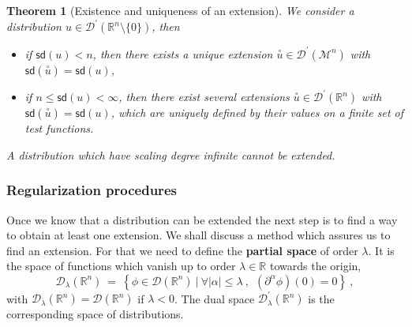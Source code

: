 \documentclass[11pt]{book}
\newcommand{\sd}{\mathsf{sd}}
\newcommand{\abs}[1]{\left|#1\right|}
\newcommand{\exte}[1]{\overset{\circ}{#1}}
\newcommand{\Dcal}{\mathcal{D}}
\newcommand{\Mcal}{\mathcal{M}}
\newcommand{\Rbb}{\mathbb{R}}
\theoremstyle{break}
\newtheorem{theorem}{Theorem}[chapter]
\begin{document}
\begin{theorem}[Existence and uniqueness of an extension]\label{theo:extension_distribution_numeric}
We consider a distribution $u \in \Dcal^\prime(\Rbb^n \setminus \{0\})$, then
%
\vspace*{-5pt}
\begin{itemize}
\setlength\itemsep{0pt}
\item if $\sd(u) < n$, then there exists a unique extension $\exte{u} \in \Dcal^\prime(\Mcal^n)$ with $\sd(\exte{u})=\sd(u)$,
%
\item if $n \leq \sd(u) < \infty$, then there exist several extensions $\exte{u} \in \Dcal^\prime(\Rbb^n)$ with $\sd(\exte{u})=\sd(u)$, which are uniquely defined by their values on a finite set of test functions.
\end{itemize}
%
A distribution which have scaling degree infinite cannot be extended.
\end{theorem}


\subsubsection{Regularization procedures}
\label{p:REG_PROCED}


Once we know that a distribution can be extended the next step is to find a way to obtain at least one extension. We shall discuss a method which assures us to find an extension.  For that we need to define the \textbf{partial space} of order $\lambda$. It is the space of functions which vanish up to order $\lambda \in \Rbb$ towards the origin, 
%
\begin{equation*}
\Dcal_{\lambda}(\Rbb^n) \ = \ \left\{ \phi \in \Dcal(\Rbb^n) \ | \ \forall \abs{\alpha} \leq \lambda \ , \ \ \left(\partial^{\alpha}\phi\right)(0)=0 \right\} \ ,
\end{equation*}
%
with $\Dcal_\lambda(\Rbb^n) = \Dcal(\Rbb^n)$ if $\lambda < 0$. The dual space $\Dcal^\prime_\lambda(\Rbb^n)$ is the corresponding space of distributions. 
\end{document}

